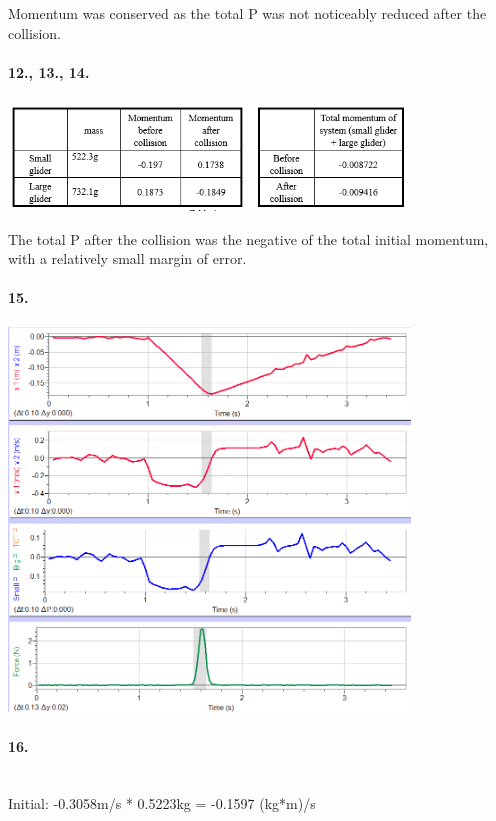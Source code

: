     Momentum was conserved as the total P was not noticeably reduced after the collision.

    \paragraph*{12., 13., 14.}

    {\centering\includegraphics[width=0.8\textwidth]{image13.png}}

    The total P after the collision was the negative of the total initial momentum, with a relatively small margin of error.

    \paragraph*{15.}

    {\centering\includegraphics[width=0.8\textwidth]{image11.png}}

    \paragraph*{16.}\mbox{}\\

    Initial: -0.3058m/s * 0.5223kg = -0.1597 (kg*m)/s
    
